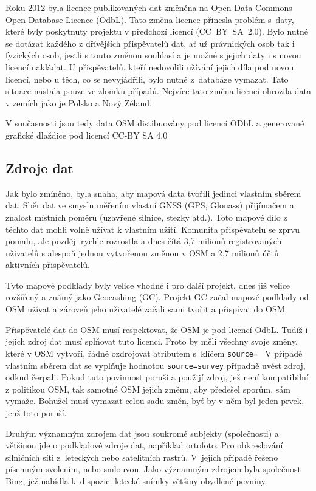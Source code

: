 Roku 2012 byla licence publikovaných dat změněna na Open Data Commons 
Open Database Licence (OdbL).
Tato změna licence přinesla problém
s~daty, které byly poskytnuty projektu v předchozí licencí 
(CC­~BY~SA~2.0). Bylo nutné se dotázat každého z dřívějších 
přispěvatelů dat, ať už právnických osob tak i fyzických osob, jestli 
s touto změnou souhlasí a je možné s jejich daty i s novou licencí 
nakládat. U přispěvatelů, kteří nedovolili užívání jejich díla 
pod novou licencí, nebo u těch, co se nevyjádřili, bylo nutné 
z~databáze vymazat. Tato situace nastala pouze ve zlomku případů. 
Nejvíce tato změna licencí ohrozila data v zemích jako je Polsko a Nový Zéland.

V současnosti jsou tedy data OSM distibuovány pod licencí ODbL a
generované grafické dlaždice pod licencí CC-BY SA 4.0
\cite {OSMlicenceIssue}


\subsection{Zdroje dat}
\label{Zdroje dat}

Jak bylo zmíněno, byla snaha, aby mapová data tvořili jedinci vlastním 
sběrem dat. Sběr dat ve smyslu měřením vlastní GNSS (GPS, Glonass) 
přijímačem a znalost místních poměrů (uzavřené silnice, stezky atd.). 
Toto mapové dílo z těchto dat mohli volně užívat k vlastním užití. 
Komunita přispěvatelů se zprvu pomalu, ale později rychle rozrostla a 
dnes čítá 3,7 milionů registrovaných uživatelů s alespoň jednou 
vytvořenou změnou v OSM a 2,7 milionů účtů aktivních přispěvatelů.\cite{OSMstats}

Tyto mapové podklady byly velice vhodné i pro další projekt, dnes již 
velice rozšířený a známý jako Geocashing (GC). Projekt GC začal mapové 
podklady od OSM užívat a zároveň jeho uživatelé začali sami tvořit a 
přispívat do OSM. 

Přispěvatelé dat do OSM musí respektovat, že OSM je pod licencí OdbL. 
Tudíž i jejich zdroj dat musí splňovat tuto licenci. Proto by měli 
všechny svoje změny, které v OSM vytvoří, řádně ozdrojovat atributem 
s~klíčem 
{\tt source= }
V případě vlastním sběrem dat se vyplňuje hodnotou 
{\tt source=survey}
případně uvést zdroj, odkud čerpali. Pokud tuto povinnost poruší a 
použijí zdroj, jež není kompatibilní z politikou OSM, tak samotné OSM 
jejich změnu, aby předešel sporům, sám vymaže. Bohužel musí vymazat 
celou sadu změn, byť by v něm byl jeden prvek, jenž toto poruší. 

Druhým významným zdrojem dat jsou soukromé subjekty (společnosti) a
většinou jde o podkladové zdroje dat, například ortofoto. Pro obkreslování
silničních síti z~leteckých nebo satelitních rastrů. V~jejich případě 
řešeno písemným svolením, nebo smlouvou. Jako významným zdrojem byla 
společnost Bing, jež nabídla k~dispozici letecké snímky většiny 
obydlené pevniny. 

